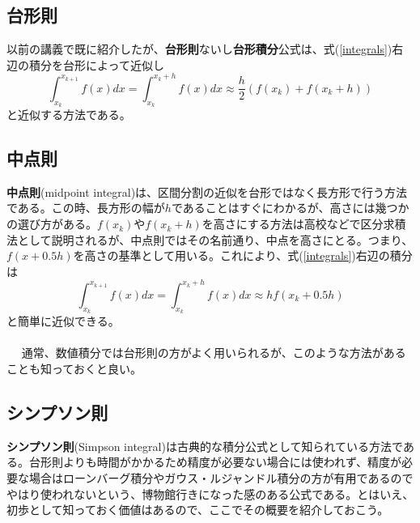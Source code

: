 \subsection{台形則}
以前の講義で既に紹介したが、\textbf{台形則}ないし\textbf{台形積分}公式は、式(\ref{integrals})右辺の積分を台形によって近似し
\begin{equation}
\int^{x_{k+1}}_{x_k}f(x)dx=\int^{x_k+h}_{x_k}f(x)dx\approx \frac{h}{2}\left(f(x_k)+f(x_k+h)\right)
\end{equation}
と近似する方法である。

\subsection{中点則}
\textbf{中点則}(midpoint integral)は、区間分割の近似を台形ではなく長方形で行う方法である。この時、長方形の幅が$h$であることはすぐにわかるが、高さには幾つかの選び方がある。$f(x_k)$や$f(x_k+h)$を高さにする方法は高校などで区分求積法として説明されるが、中点則ではその名前通り、中点を高さにとる。つまり、$f(x+0.5h)$を高さの基準として用いる。これにより、式(\ref{integrals})右辺の積分は
\begin{equation}
\int^{x_{k+1}}_{x_k}f(x)dx=\int^{x_k+h}_{x_k}f(x)dx\approx hf(x_k+0.5h)
\end{equation}
と簡単に近似できる。
\\ \\　
通常、数値積分では台形則の方がよく用いられるが、このような方法があることも知っておくと良い。

\subsection{シンプソン則}
\textbf{シンプソン則}(Simpson integral)は古典的な積分公式として知られている方法である。台形則よりも時間がかかるため精度が必要ない場合には使われず、精度が必要な場合はローンバーグ積分やガウス・ルジャンドル積分の方が有用であるのでやはり使われないという、博物館行きになった感のある公式である。とはいえ、初歩として知っておく価値はあるので、ここでその概要を紹介しておこう。

